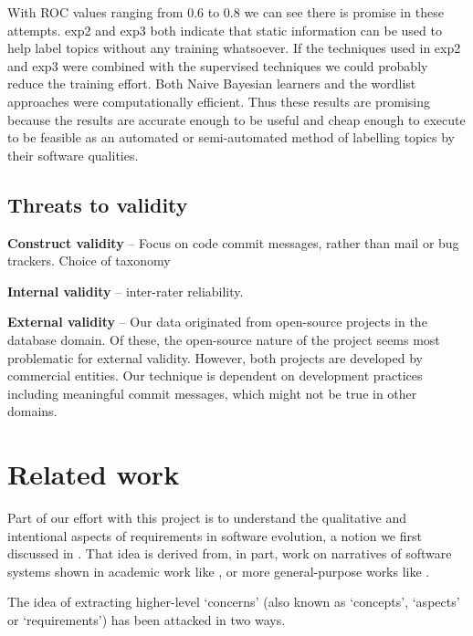 \documentclass{acm_proc_article-sp}
\begin{document}
With ROC values ranging from $0.6$ to $0.8$ we can see there is promise in these attempts. \textsf{exp2} and \textsf{exp3} both indicate that static information can be used to help label topics without any training whatsoever. If the techniques used in \textsf{exp2} and \textsf{exp3} were combined with the supervised techniques we could probably reduce the training effort. 
Both Naive Bayesian learners and the wordlist approaches were computationally efficient. Thus these results are promising because the results are accurate enough to be useful and cheap enough to execute to be feasible as an automated or semi-automated method of labelling topics by their software qualities.



\subsection{Threats to validity}
\textbf{Construct validity} -- Focus on code commit messages, rather than mail or bug trackers. Choice of taxonomy

\textbf{Internal validity} -- inter-rater reliability.

\textbf{External validity} -- Our data originated from open-source projects in the database domain. Of these, the open-source nature of the project seems most problematic for external validity. However, both projects are developed by commercial entities. Our technique is dependent on development practices including meaningful commit messages, which might not be true in other domains.

\section{Related work}

Part of our effort with this project is to understand the qualitative and intentional aspects of requirements in software evolution, a notion we first discussed in \cite{ernst07icsm}. That idea is derived from, in part, work on narratives of software systems shown in academic work like \cite{anton01}, or more general-purpose works like \cite{waldo93}.

The idea of extracting higher-level `concerns' (also known as `concepts', `aspects' or `requirements') has been attacked in two ways. 
\end{document}
